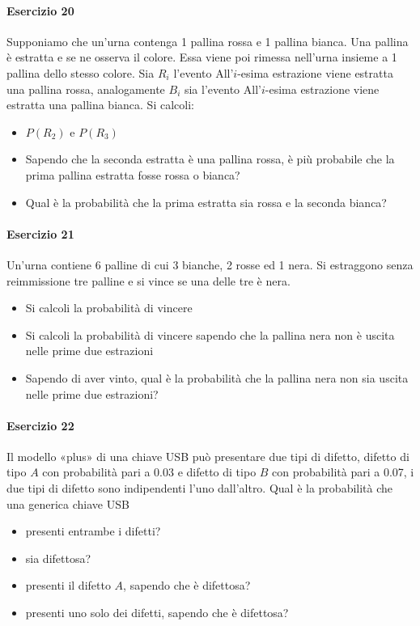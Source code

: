 \documentclass[12pt]{article}
\begin{document}
    \paragraph{Esercizio 20}
    Supponiamo che un’urna contenga 1 pallina rossa e 1 pallina bianca. Una pallina è estratta e se ne osserva il colore. Essa viene poi rimessa nell’urna insieme a 1 pallina dello stesso colore. Sia $R_i$ l’evento {All’$i$-esima estrazione viene estratta una pallina rossa}, analogamente $B_i$ sia l’evento {All’$i$-esima estrazione viene estratta una pallina bianca}. Si calcoli:
    \begin{itemize}
        \item $P(R_2)$ e $P(R_3)$
        \item Sapendo che la seconda estratta è una pallina rossa, è più probabile che la prima pallina estratta fosse rossa o bianca?
        \item Qual è la probabilità che la prima estratta sia rossa e la seconda bianca?
    \end{itemize}
    \paragraph{Esercizio 21}
    Un’urna contiene 6 palline di cui 3 bianche, 2 rosse ed 1 nera. Si estraggono senza reimmissione tre palline e si vince se una delle tre è nera.
    \begin{itemize}
        \item Si calcoli la probabilità di vincere
        \item Si calcoli la probabilità di vincere sapendo che la pallina nera non è uscita nelle prime due estrazioni
        \item Sapendo di aver vinto, qual è la probabilità che la pallina nera non sia uscita nelle prime due estrazioni?
    \end{itemize}
    \paragraph{Esercizio 22}
    Il modello «plus» di una chiave USB può presentare due tipi di difetto, difetto di tipo $A$ con probabilità pari a 0.03 e difetto di tipo $B$ con probabilità pari a 0.07, i due tipi di difetto sono indipendenti l’uno dall’altro. Qual è la probabilità che una generica chiave USB
    \begin{itemize}
        \item presenti entrambe i difetti?
        \item sia difettosa?
        \item presenti il difetto $A$, sapendo che è difettosa?
        \item presenti uno solo dei difetti, sapendo che è difettosa?
    \end{itemize}
    \newpage
\end{document}
